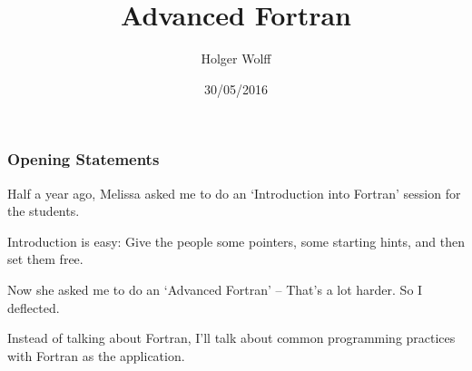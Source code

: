 \documentclass{beamer}
\title{Advanced Fortran}
\author{Holger Wolff}
\date{30/05/2016}
\begin{document}
\begin{frame}
  \titlepage
\end{frame}

\section*{}

\begin{frame}
  \tableofcontents
\end{frame}

\begin{frame}
    \frametitle{Opening Statements}
    Half a year ago, Melissa asked me to do an `Introduction into Fortran'
    session for the students. 

    Introduction is easy: Give the people some pointers, some starting hints, and then set them free.

    Now she asked me to do an `Advanced Fortran' -- That's a lot harder.
    So I deflected.

    Instead of talking about Fortran, I'll talk about common programming practices with Fortran as the application.
\end{frame}










\end{document}
